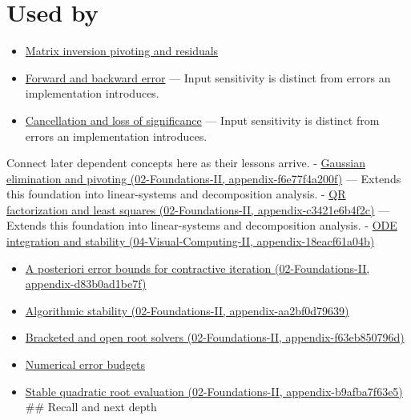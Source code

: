 \section{Used by}\label{appendix-8f6a01f284a7-used-by}

\begin{itemize}
\item
  \hyperref[appendix-48d2e66378ab]{Matrix inversion pivoting and residuals}
\item
  \hyperref[appendix-a7fbaf6d1b1c]{Forward and backward error} --- Input sensitivity is distinct from errors an implementation introduces.
\item
  \hyperref[appendix-a2773a6a2f9d]{Cancellation and loss of significance} --- Input sensitivity is distinct from errors an implementation introduces.
\end{itemize}

Connect later dependent concepts here as their lessons arrive. - \href{../02-Foundations-II/main.pdf\#nameddest=appendix-f6e77f4a200f}{Gaussian elimination and pivoting (02-Foundations-II, appendix-f6e77f4a200f)} --- Extends this foundation into linear-systems and decomposition analysis. - \href{../02-Foundations-II/main.pdf\#nameddest=appendix-c3421e6b4f2c}{QR factorization and least squares (02-Foundations-II, appendix-c3421e6b4f2c)} --- Extends this foundation into linear-systems and decomposition analysis. - \href{../04-Visual-Computing-II/main.pdf\#nameddest=appendix-18eacf61a04b}{ODE integration and stability (04-Visual-Computing-II, appendix-18eacf61a04b)}

\begin{itemize}
\tightlist
\item
  \href{../02-Foundations-II/main.pdf\#nameddest=appendix-d83b0ad1be7f}{A posteriori error bounds for contractive iteration (02-Foundations-II, appendix-d83b0ad1be7f)}
\item
  \href{../02-Foundations-II/main.pdf\#nameddest=appendix-aa2bf0d79639}{Algorithmic stability (02-Foundations-II, appendix-aa2bf0d79639)}
\item
  \href{../02-Foundations-II/main.pdf\#nameddest=appendix-f63eb850796d}{Bracketed and open root solvers (02-Foundations-II, appendix-f63eb850796d)}
\item
  \hyperref[appendix-31b8c295e05f]{Numerical error budgets}
\item
  \href{../02-Foundations-II/main.pdf\#nameddest=appendix-b9afba7f63e5}{Stable quadratic root evaluation (02-Foundations-II, appendix-b9afba7f63e5)} \#\# Recall and next depth
\end{itemize}

